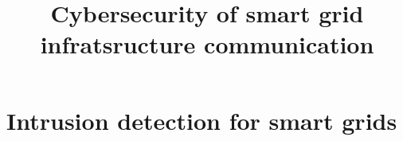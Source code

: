 \documentclass{masterthesis-uc2-en}
\title{Cybersecurity of smart grid infratsructure communication}
\begin{document}
\frontmatter
	\maketitlepage
	\pagestyle{plain}
	
	\hypersetup{citecolor=blue}

	
	

\mainmatter
	\pagestyle{fancy}
	



	\chapter{Intrusion detection for smart grids}
	
	
\backmatter
	
	
\end{document}
